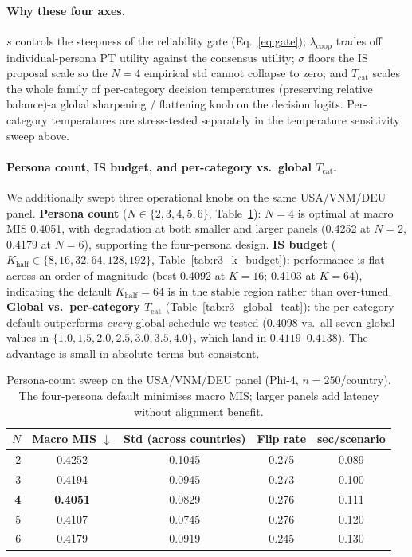 \documentclass{article}
\begin{document}
\paragraph{Why these four axes.} $s$ controls the steepness of the reliability gate (Eq.~\ref{eq:gate}); $\lambda_{\text{coop}}$ trades off individual-persona PT utility against the consensus utility; $\sigma$ floors the IS proposal scale so the $N{=}4$ empirical std cannot collapse to zero; and $T_{\text{cat}}$ scales the whole family of per-category decision temperatures (preserving relative balance)-a global sharpening / flattening knob on the decision logits. Per-category temperatures are stress-tested separately in the temperature sensitivity sweep above.

\paragraph{Persona count, IS budget, and per-category vs.\ global $T_{\text{cat}}$.}
We additionally swept three operational knobs on the same USA/VNM/DEU panel. \textbf{Persona count} ($N\in\{2,3,4,5,6\}$, Table~\ref{tab:r3_persona_count}): $N{=}4$ is optimal at macro MIS 0.4051, with degradation at both smaller and larger panels (0.4252 at $N{=}2$, 0.4179 at $N{=}6$), supporting the four-persona design. \textbf{IS budget} ($K_{\text{half}}\in\{8,16,32,64,128,192\}$, Table~\ref{tab:r3_k_budget}): performance is flat across an order of magnitude (best 0.4092 at $K{=}16$; 0.4103 at $K{=}64$), indicating the default $K_{\text{half}}{=}64$ is in the stable region rather than over-tuned. \textbf{Global vs.\ per-category $T_{\text{cat}}$} (Table~\ref{tab:r3_global_tcat}): the per-category default outperforms \emph{every} global schedule we tested (0.4098 vs.\ all seven global values in $\{1.0, 1.5, 2.0, 2.5, 3.0, 3.5, 4.0\}$, which land in $0.4119$--$0.4138$). The advantage is small in absolute terms but consistent.

\begin{table}[H]
\centering\small
\caption{Persona-count sweep on the USA/VNM/DEU panel (Phi-4, $n{=}250$/country). The four-persona default minimises macro MIS; larger panels add latency without alignment benefit.}
\label{tab:r3_persona_count}
\begin{tabular}{rcccc}\toprule
$N$ & Macro MIS $\downarrow$ & Std (across countries) & Flip rate & sec/scenario \\\midrule
2 & 0.4252 & 0.1045 & 0.275 & 0.089 \\
3 & 0.4194 & 0.0945 & 0.273 & 0.100 \\
\textbf{4} & \textbf{0.4051} & 0.0829 & 0.276 & 0.111 \\
5 & 0.4107 & 0.0745 & 0.276 & 0.120 \\
6 & 0.4179 & 0.0919 & 0.245 & 0.130 \\
\bottomrule
\end{tabular}
\end{table}
\end{document}
